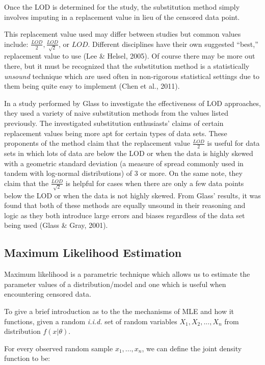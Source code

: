 \documentclass[12pt, twoside]{amherstthesis}
\begin{document}
Once the LOD is determined for the study, the substitution method simply involves imputing in a replacement value in lieu of the censored data point.

This replacement value used may differ between studies but common values include: \(\frac{LOD}{2}, \frac{LOD}{\sqrt2}\), or \(LOD\). Different disciplines have their own suggested ``best,'' replacement value to use (Lee \& Helsel, 2005). Of course there may be more out there, but it must be recognized that the substitution method is a statistically \emph{unsound} technique which are used often in non-rigorous statistical settings due to them being quite easy to implement (Chen et al., 2011).

In a study performed by Glass to investigate the effectiveness of LOD approaches, they used a variety of naive substitution methods from the values listed previously. The investigated substitution enthusiasts' claims of certain replacement values being more apt for certain types of data sets. These proponents of the method claim that the replacement value \(\frac{LOD}{2}\) is useful for data sets in which lots of data are below the LOD or when the data is highly skewed with a geometric standard deviation (a measure of spread commonly used in tandem with log-normal distributions) of 3 or more. On the same note, they claim that the \(\frac{LOD}{\sqrt2}\) is helpful for cases when there are only a few data points below the LOD or when the data is not highly skewed. From Glass' results, it was found that both of these methods are equally unsound in their reasoning and logic as they both introduce large errors and biases regardless of the data set being used (Glass \& Gray, 2001).

\hypertarget{MLE}{%
\subsection{Maximum Likelihood Estimation}\label{MLE}}

Maximum likelihood is a parametric technique which allows us to estimate the parameter values of a distribution/model and one which is useful when encountering censored data.

To give a brief introduction as to the the mechanisms of MLE and how it functions, given a random \emph{i.i.d.} set of random variables \(X_1, X_2,...,X_n\) from distribution \(f(x|\theta)\).

For every observed random sample \(x_1,...,x_n\), we can define the joint density function to be:
\end{document}
